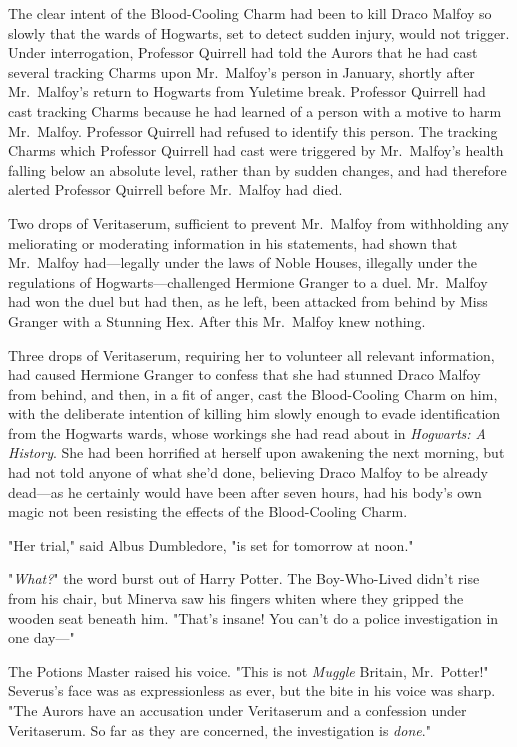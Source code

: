 The clear intent of the Blood-Cooling Charm had been to kill Draco Malfoy so slowly that the wards of Hogwarts, set to detect sudden injury, would not trigger. Under interrogation, Professor Quirrell had told the Aurors that he had cast several tracking Charms upon Mr.~Malfoy's person in January, shortly after Mr.~Malfoy's return to Hogwarts from Yuletime break. Professor Quirrell had cast tracking Charms because he had learned of a person with a motive to harm Mr.~Malfoy. Professor Quirrell had refused to identify this person. The tracking Charms which Professor Quirrell had cast were triggered by Mr.~Malfoy's health falling below an absolute level, rather than by sudden changes, and had therefore alerted Professor Quirrell before Mr.~Malfoy had died.

Two drops of Veritaserum, sufficient to prevent Mr.~Malfoy from withholding any meliorating or moderating information in his statements, had shown that Mr.~Malfoy had---legally under the laws of Noble Houses, illegally under the regulations of Hogwarts---challenged Hermione Granger to a duel. Mr.~Malfoy had won the duel but had then, as he left, been attacked from behind by Miss Granger with a Stunning Hex. After this Mr.~Malfoy knew nothing.

Three drops of Veritaserum, requiring her to volunteer all relevant information, had caused Hermione Granger to confess that she had stunned Draco Malfoy from behind, and then, in a fit of anger, cast the Blood-Cooling Charm on him, with the deliberate intention of killing him slowly enough to evade identification from the Hogwarts wards, whose workings she had read about in \emph{Hogwarts: A History}. She had been horrified at herself upon awakening the next morning, but had not told anyone of what she'd done, believing Draco Malfoy to be already dead---as he certainly would have been after seven hours, had his body's own magic not been resisting the effects of the Blood-Cooling Charm.

"Her trial," said Albus Dumbledore, "is set for tomorrow at noon."

"\emph{What?}" the word burst out of Harry Potter. The Boy-Who-Lived didn't rise from his chair, but Minerva saw his fingers whiten where they gripped the wooden seat beneath him. "That's insane! You can't do a police investigation in one day---"

The Potions Master raised his voice. "This is not \emph{Muggle} Britain, Mr.~Potter!" Severus's face was as expressionless as ever, but the bite in his voice was sharp. "The Aurors have an accusation under Veritaserum and a confession under Veritaserum. So far as they are concerned, the investigation is \emph{done}."

